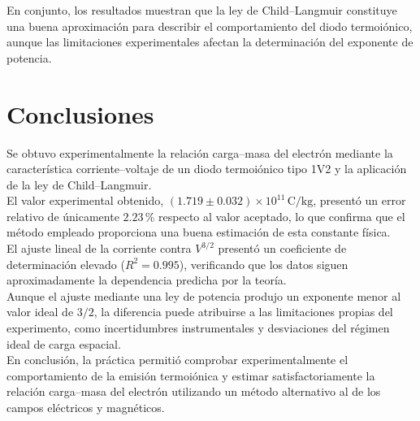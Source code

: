 \documentclass{article}
\begin{document}
En conjunto, los resultados muestran que la ley de Child--Langmuir constituye una
buena aproximación para describir el comportamiento del diodo termoiónico, aunque
las limitaciones experimentales afectan la determinación del exponente de potencia.\\

\section{Conclusiones}

Se obtuvo experimentalmente la relación carga--masa del electrón mediante la
característica corriente--voltaje de un diodo termoiónico tipo 1V2 y la aplicación
de la ley de Child--Langmuir.\\

El valor experimental obtenido,
$\left(1.719\pm0.032\right)\times10^{11}\,\mathrm{C/kg}$,
presentó un error relativo de únicamente $2.23\,\%$ respecto al valor aceptado,
lo que confirma que el método empleado proporciona una buena estimación de esta
constante física.\\

El ajuste lineal de la corriente contra $V^{3/2}$ presentó un coeficiente de
determinación elevado ($R^2=0.995$), verificando que los datos siguen
aproximadamente la dependencia predicha por la teoría.\\

Aunque el ajuste mediante una ley de potencia produjo un exponente menor al valor
ideal de $3/2$, la diferencia puede atribuirse a las limitaciones propias del
experimento, como incertidumbres instrumentales y desviaciones del régimen ideal de
carga espacial.\\

En conclusión, la práctica permitió comprobar experimentalmente el comportamiento
de la emisión termoiónica y estimar satisfactoriamente la relación carga--masa del
electrón utilizando un método alternativo al de los campos eléctricos y magnéticos.
\end{document}
